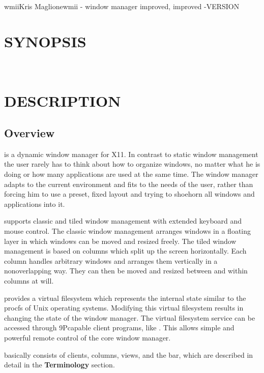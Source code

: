 \begin{Name}{1}{wmii}{Kris Maglione}{}{wmii - window manager improved, improved}
	-VERSION
\end{Name}

\section{SYNOPSIS}
   \\
 

\section{DESCRIPTION}

\subsection{Overview}

 is a dynamic window manager for X11. In contrast to
static window management the user rarely has to think about how to
organize windows, no matter what he is doing or how many
applications are used at the same time.  The window manager adapts
to the current environment and fits to the needs of the user, rather
than forcing him to use a preset, fixed layout and trying to
shoehorn all windows and applications into it.

 supports classic and tiled window management with
extended keyboard and mouse control. The classic window management
arranges windows in a floating layer in which windows can be moved
and resized freely. The tiled window management is based on columns
which split up the screen horizontally. Each column handles
arbitrary windows and arranges them vertically in a non\-overlapping
way. They can then be moved and resized between and within columns
at will.

 provides a virtual filesystem which represents the
internal state similar to the procfs of Unix operating systems.
Modifying this virtual filesystem results in changing the state of
the window manager. The virtual filesystem service can be accessed
through 9P\-capable client programs, like .  This
allows simple and powerful remote control of the core window
manager.

 basically consists of clients, columns, views, and the
bar, which are described in detail in the \textbf{Terminology}
section.


